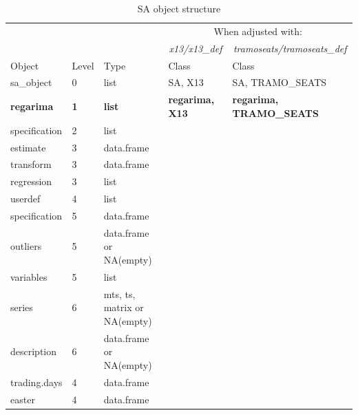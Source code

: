 \documentclass[article]{jss}
\begin{document}
\begingroup\fontsize{7}{9}\selectfont

\begin{longtable}[t]{lllll}
\caption{\label{tab:unnamed-chunk-6}\label{tab:obj_tab}SA object structure}\\
\toprule
\multicolumn{1}{c}{ } & \multicolumn{1}{c}{ } & \multicolumn{1}{c}{ } & \multicolumn{2}{c}{When adjusted with:} \\
\cmidrule(l{2pt}r{2pt}){4-5}
\multicolumn{1}{c}{\em  } & \multicolumn{1}{c}{\em  } & \multicolumn{1}{c}{\em  } & \multicolumn{1}{c}{\em x13/x13\_def} & \multicolumn{1}{c}{\em  tramoseats/tramoseats\_def} \\
\cmidrule(l{2pt}r{2pt}){4-4} \cmidrule(l{2pt}r{2pt}){5-5}
Object & Level & Type & Class & Class\\
\midrule
sa\_object & 0 & list & SA, X13 & SA, TRAMO\_SEATS\\
\textbf{\hspace{1em}regarima} & \textbf{1} & \textbf{list} & \textbf{regarima, X13} & \textbf{regarima, TRAMO\_SEATS}\\
\hspace{2em}specification & 2 & list &  & \\
\hspace{3em}estimate & 3 & data.frame &  & \\
\hspace{3em}transform & 3 & data.frame &  & \\
\addlinespace
\hspace{3em}regression & 3 & list &  & \\
\hspace{4em}userdef & 4 & list &  & \\
\hspace{5em}specification & 5 & data.frame &  & \\
\hspace{5em}outliers & 5 & data.frame or NA(empty) &  & \\
\hspace{5em}variables & 5 & list &  & \\
\addlinespace
\hspace{6em}series & 6 & mts, ts, matrix or NA(empty) &  & \\
\hspace{6em}description & 6 & data.frame or NA(empty) &  & \\
\hspace{4em}trading.days & 4 & data.frame &  & \\
\hspace{4em}easter & 4 & data.frame &  & \\

\end{longtable}
\end{document}
